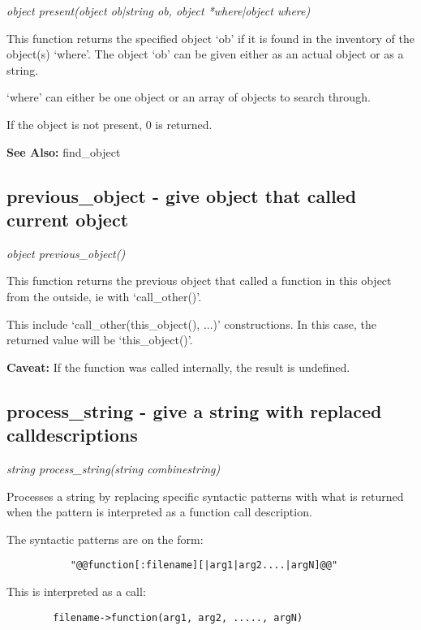     {\em object present(object ob|string ob, object *where|object where)}

    This function returns the specified object `ob' if it is found
    in the inventory of the object(s) `where'. The object `ob' can
    be given either as an actual object or as a string.

    `where' can either be one object or an array of objects to search
    through.

    If the object is not present, 0 is returned.

    {\bf See Also: }    find\_object



\subsection{previous\_object - give object that called current object}

    {\em object previous\_object()}

    This function returns the previous object that called a function
    in this object from the outside, ie with `call\_other()'. 

    This include `call\_other(this\_object(), ...)' constructions. In 
    this case, the returned value will be `this\_object()'.

    {\bf Caveat: }  If the function was called internally, the result is undefined.



\subsection{process\_string - give a string with replaced calldescriptions}

    {\em string process\_string(string combinestring)}

    Processes a string by replacing specific syntactic patterns with
    what is returned when the pattern is interpreted as a function
    call description.

    The syntactic patterns are on the form:

\begin{verbatim}
           "@@function[:filename][|arg1|arg2....|argN]@@"
\end{verbatim}

    This is interpreted as a call:

\begin{verbatim}
        filename->function(arg1, arg2, ....., argN)
\end{verbatim}

